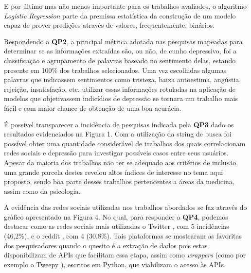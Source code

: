 \documentclass[conference]{IEEEtran}
\begin{document}
E por último mas não menos importante para os trabalhos avaliados, o algoritmo \textit{Logistic Regression} parte da premissa estatística da construção de um modelo capaz de prover predições através de valores, frequentemente, binários.

Respondendo a \textbf{QP2}, a principal métrica adotada nas pesquisas mapeadas para determinar se as informações extraídas são, ou não, de cunho depressivo, foi a classificação e agrupamento de palavras baseado no sentimento delas, estando presente em 100\% dos trabalhos selecionados. Uma vez escolhidas algumas palavras que indicassem sentimentos como tristeza, baixa autoestima, angústia, rejeição, insatisfação, etc, utilizar essas informações rotuladas na aplicação de modelos que objetivassem indicídios de depressão se tornara um trabalho mais fácil e com maior chance de obtenção de uma boa acurácia. 

É possível transparecer a incidência de pesquisas indicada pela \textbf{QP3} dado os resultados evidenciados na Figura 1. Com a utilização da string de busca foi possível obter uma quantidade considerável de trabalhos dos quais correlacionam redes sociais e depressão para investigar possíveis casos entre seus usuários. Apesar da maioria dos trabalhos não ter se adequado aos critérios de inclusão, uma grande parcela destes revelou altos índices de interesse no tema aqui proposto, sendo boa parte desses trabalhos pertencentes a áreas da medicina, assim como da psicologia.

A evidência das redes sociais utilizadas nos trabalhos abordados se faz através do gráfico apresentado na Figura 4. No qual, para responder a \textbf{QP4}, podemos destacar como as redes sociais mais utilizadas o Twitter \cite{ArtigoN2, ArtigoN4, ArtigoN7, ArtigoN8, ArtigoN9, ArtigoN12}, com 5 incidências (46,2\%), e o reddit \cite{ArtigoN1, ArtigoN5, ArtigoN6, ArtigoN10}, com 4 (30,8\%). Tais plataformas se mostraram as favoritas dos pesquisadores quando o quesito é a extração de dados pois estas disponibilizam de APIs que facilitam essa etapa, assim como \textit{wrappers} (como por exemplo o Tweepy \cite{ArtigoN8}), escritos em Python, que viabilizam o acesso às APIs.
\end{document}

